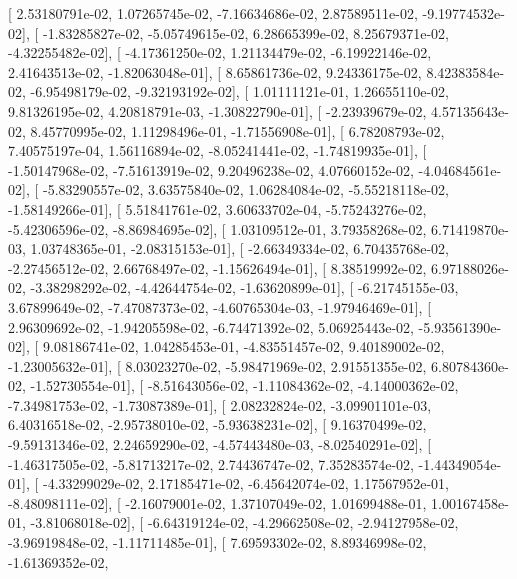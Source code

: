 \documentclass{article}
\begin{document}
       [  2.53180791e-02,   1.07265745e-02,  -7.16634686e-02,
          2.87589511e-02,  -9.19774532e-02],
       [ -1.83285827e-02,  -5.05749615e-02,   6.28665399e-02,
          8.25679371e-02,  -4.32255482e-02],
       [ -4.17361250e-02,   1.21134479e-02,  -6.19922146e-02,
          2.41643513e-02,  -1.82063048e-01],
       [  8.65861736e-02,   9.24336175e-02,   8.42383584e-02,
         -6.95498179e-02,  -9.32193192e-02],
       [  1.01111121e-01,   1.26655110e-02,   9.81326195e-02,
          4.20818791e-03,  -1.30822790e-01],
       [ -2.23939679e-02,   4.57135643e-02,   8.45770995e-02,
          1.11298496e-01,  -1.71556908e-01],
       [  6.78208793e-02,   7.40575197e-04,   1.56116894e-02,
         -8.05241441e-02,  -1.74819935e-01],
       [ -1.50147968e-02,  -7.51613919e-02,   9.20496238e-02,
          4.07660152e-02,  -4.04684561e-02],
       [ -5.83290557e-02,   3.63575840e-02,   1.06284084e-02,
         -5.55218118e-02,  -1.58149266e-01],
       [  5.51841761e-02,   3.60633702e-04,  -5.75243276e-02,
         -5.42306596e-02,  -8.86984695e-02],
       [  1.03109512e-01,   3.79358268e-02,   6.71419870e-03,
          1.03748365e-01,  -2.08315153e-01],
       [ -2.66349334e-02,   6.70435768e-02,  -2.27456512e-02,
          2.66768497e-02,  -1.15626494e-01],
       [  8.38519992e-02,   6.97188026e-02,  -3.38298292e-02,
         -4.42644754e-02,  -1.63620899e-01],
       [ -6.21745155e-03,   3.67899649e-02,  -7.47087373e-02,
         -4.60765304e-03,  -1.97946469e-01],
       [  2.96309692e-02,  -1.94205598e-02,  -6.74471392e-02,
          5.06925443e-02,  -5.93561390e-02],
       [  9.08186741e-02,   1.04285453e-01,  -4.83551457e-02,
          9.40189002e-02,  -1.23005632e-01],
       [  8.03023270e-02,  -5.98471969e-02,   2.91551355e-02,
          6.80784360e-02,  -1.52730554e-01],
       [ -8.51643056e-02,  -1.11084362e-02,  -4.14000362e-02,
         -7.34981753e-02,  -1.73087389e-01],
       [  2.08232824e-02,  -3.09901101e-03,   6.40316518e-02,
         -2.95738010e-02,  -5.93638231e-02],
       [  9.16370499e-02,  -9.59131346e-02,   2.24659290e-02,
         -4.57443480e-03,  -8.02540291e-02],
       [ -1.46317505e-02,  -5.81713217e-02,   2.74436747e-02,
          7.35283574e-02,  -1.44349054e-01],
       [ -4.33299029e-02,   2.17185471e-02,  -6.45642074e-02,
          1.17567952e-01,  -8.48098111e-02],
       [ -2.16079001e-02,   1.37107049e-02,   1.01699488e-01,
          1.00167458e-01,  -3.81068018e-02],
       [ -6.64319124e-02,  -4.29662508e-02,  -2.94127958e-02,
         -3.96919848e-02,  -1.11711485e-01],
       [  7.69593302e-02,   8.89346998e-02,  -1.61369352e-02,
\end{document}
